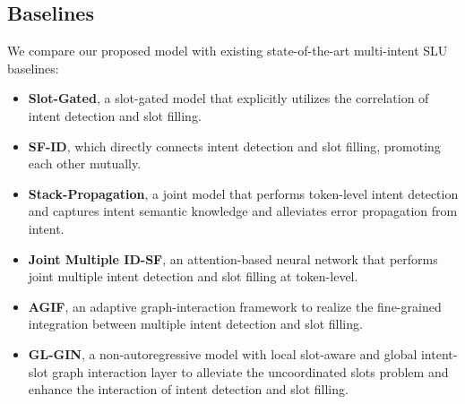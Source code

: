 \documentclass[11pt]{article}
\begin{document}
\subsection{Baselines}
We compare our proposed model with existing state-of-the-art multi-intent SLU baselines:
\begin{itemize}
  \item \textbf{Slot-Gated}\cite{DBLP:conf/naacl/GooGHHCHC18}, a slot-gated model that explicitly utilizes the correlation of intent detection and slot filling.
  \item \textbf{SF-ID}\cite{DBLP:conf/acl/ENCS19}, which directly connects intent detection and slot filling, promoting each other mutually.
  \item \textbf{Stack-Propagation}\cite{DBLP:conf/emnlp/QinCLWL19}, a joint model that performs token-level intent detection and captures intent semantic knowledge and alleviates error propagation from intent.
  \item \textbf{Joint Multiple ID-SF}\cite{DBLP:conf/naacl/GangadharaiahN19}, an attention-based neural network that performs joint multiple intent detection and slot filling at token-level.
  \item \textbf{AGIF}\cite{DBLP:conf/emnlp/QinXCL20}, an adaptive graph-interaction framework to realize the fine-grained integration between multiple intent detection and slot filling.
  \item \textbf{GL-GIN}\cite{DBLP:conf/acl/QinWXXCL20}, a non-autoregressive model with local slot-aware and global intent-slot graph interaction layer to alleviate the uncoordinated slots problem and enhance the interaction of intent detection and slot filling.
\end{itemize}
\end{document}
